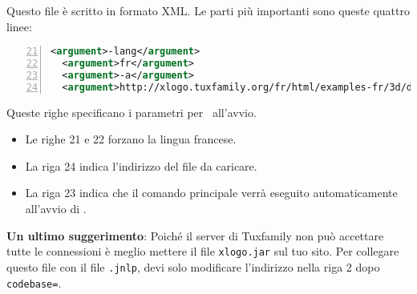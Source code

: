 Questo file è scritto in formato XML. Le parti più importanti sono queste quattro linee:
\begin{lstlisting}[language=XML,numbers=left, numberstyle=\tiny,firstnumber=21]
  <argument>-lang</argument>
  <argument>fr</argument>
  <argument>-a</argument>
  <argument>http://xlogo.tuxfamily.org/fr/html/examples-fr/3d/de.lgo</argument>
\end{lstlisting}

Queste righe specificano i parametri per \xlogo\ all'avvio.

\begin{itemize}
	\item Le righe 21 e 22 forzano la lingua francese.
	\item La riga 24 indica l'indirizzo del file da caricare.
	\item La riga 23 indica che il comando principale verrà eseguito automaticamente all'avvio di \xlogo.
\end{itemize}
\vspace{0.5cm}
\textbf{Un ultimo suggerimento}: Poiché il server di Tuxfamily non può accettare tutte le connessioni è meglio mettere il file \texttt{xlogo.jar} sul tuo sito. Per collegare questo file con il file \texttt{.jnlp}, devi solo modificare l'indirizzo nella riga 2 dopo \texttt{codebase=}.